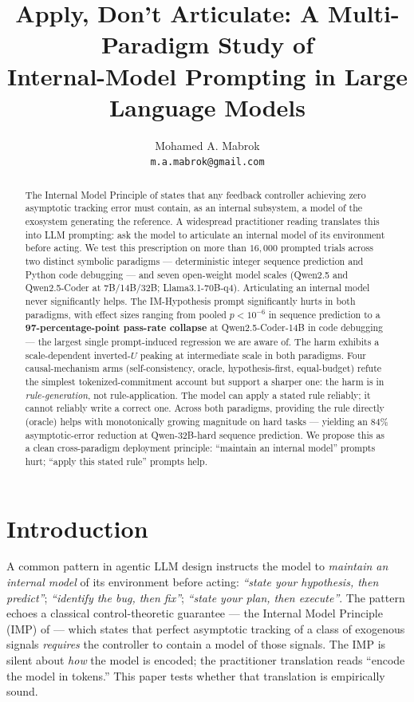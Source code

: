 \documentclass{article}
\title{\textbf{Apply, Don't Articulate: A Multi-Paradigm Study of\\
Internal-Model Prompting in Large Language Models}}
\author{%
  Mohamed A. Mabrok\\
  \texttt{m.a.mabrok@gmail.com}
}
\date{}
\begin{document}
\maketitle

\begin{abstract}
The Internal Model Principle of \citet{francis1976internal} states
that any feedback controller achieving zero asymptotic tracking
error must contain, as an internal subsystem, a model of the
exosystem generating the reference.  A widespread practitioner
reading translates this into LLM prompting: ask the model to
articulate an internal model of its environment before acting.
We test this prescription on more than $16{,}000$ prompted trials
across two distinct symbolic paradigms --- deterministic integer
sequence prediction and Python code debugging --- and seven
open-weight model scales (Qwen2.5 and Qwen2.5-Coder at
7B/14B/32B; Llama3.1-70B-q4).
Articulating an internal model never significantly helps.  The
IM-Hypothesis prompt significantly hurts in both paradigms, with
effect sizes ranging from pooled $p < 10^{-6}$ in sequence
prediction to a \textbf{97-percentage-point pass-rate collapse} at
Qwen2.5-Coder-14B in code debugging --- the largest single
prompt-induced regression we are aware of.  The harm exhibits a
scale-dependent inverted-$U$ peaking at intermediate scale in both
paradigms.  Four causal-mechanism arms (self-consistency, oracle,
hypothesis-first, equal-budget) refute the simplest
tokenized-commitment account but support a sharper one: the harm
is in \emph{rule-generation}, not rule-application.  The model can
apply a stated rule reliably; it cannot reliably write a correct
one.  Across both paradigms, providing the rule directly (oracle)
helps with monotonically growing magnitude on hard tasks ---
yielding an $84\%$ asymptotic-error reduction at Qwen-32B-hard
sequence prediction.  We propose this as a clean cross-paradigm
deployment principle:  ``maintain an internal model'' prompts
hurt; ``apply this stated rule'' prompts help.
\end{abstract}

\section{Introduction}
\label{sec:intro}

A common pattern in agentic LLM design instructs the model to
\emph{maintain an internal model} of its environment before acting:
\textit{``state your hypothesis, then predict''}; \textit{``identify
the bug, then fix''}; \textit{``state your plan, then execute''}.
The pattern echoes a classical control-theoretic guarantee --- the
Internal Model Principle (IMP) of \citet{francis1976internal} ---
which states that perfect asymptotic tracking of a class of
exogenous signals \emph{requires} the controller to contain a model
of those signals.  The IMP is silent about \emph{how} the model is
encoded; the practitioner translation reads ``encode the model in
tokens.''  This paper tests whether that translation is empirically
sound.
\end{document}
